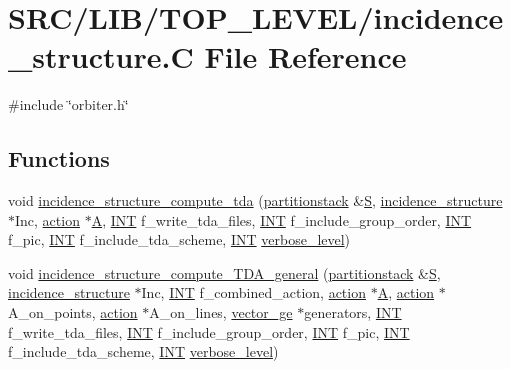\hypertarget{_t_o_p___l_e_v_e_l_2incidence__structure_8_c}{}\section{S\+R\+C/\+L\+I\+B/\+T\+O\+P\+\_\+\+L\+E\+V\+E\+L/incidence\+\_\+structure.C File Reference}
\label{_t_o_p___l_e_v_e_l_2incidence__structure_8_c}
{\ttfamily \#include \char`\"{}orbiter.\+h\char`\"{}}\newline
\subsection*{Functions}
\begin{DoxyCompactItemize}
\item 
void \mbox{\hyperlink{_t_o_p___l_e_v_e_l_2incidence__structure_8_c_ab3a7584f120bbaf752a5bd831d3ebf72}{incidence\+\_\+structure\+\_\+compute\+\_\+tda}} (\mbox{\hyperlink{classpartitionstack}{partitionstack}} \&\mbox{\hyperlink{simeon_8_c_adab47f8243f1b5a2c31df2535d6b37d0}{S}}, \mbox{\hyperlink{classincidence__structure}{incidence\+\_\+structure}} $\ast$Inc, \mbox{\hyperlink{classaction}{action}} $\ast$\mbox{\hyperlink{simeon_8_c_a97833f04c3a9c008df5521a2fc291bb4}{A}}, \mbox{\hyperlink{galois_8h_a09fddde158a3a20bd2dcadb609de11dc}{I\+NT}} f\+\_\+write\+\_\+tda\+\_\+files, \mbox{\hyperlink{galois_8h_a09fddde158a3a20bd2dcadb609de11dc}{I\+NT}} f\+\_\+include\+\_\+group\+\_\+order, \mbox{\hyperlink{galois_8h_a09fddde158a3a20bd2dcadb609de11dc}{I\+NT}} f\+\_\+pic, \mbox{\hyperlink{galois_8h_a09fddde158a3a20bd2dcadb609de11dc}{I\+NT}} f\+\_\+include\+\_\+tda\+\_\+scheme, \mbox{\hyperlink{galois_8h_a09fddde158a3a20bd2dcadb609de11dc}{I\+NT}} \mbox{\hyperlink{simeon_8_c_a818073fbcc2f439e7c56952f67386122}{verbose\+\_\+level}})
\item 
void \mbox{\hyperlink{_t_o_p___l_e_v_e_l_2incidence__structure_8_c_a21ab759f6e646f3fe703c17f39361448}{incidence\+\_\+structure\+\_\+compute\+\_\+\+T\+D\+A\+\_\+general}} (\mbox{\hyperlink{classpartitionstack}{partitionstack}} \&\mbox{\hyperlink{simeon_8_c_adab47f8243f1b5a2c31df2535d6b37d0}{S}}, \mbox{\hyperlink{classincidence__structure}{incidence\+\_\+structure}} $\ast$Inc, \mbox{\hyperlink{galois_8h_a09fddde158a3a20bd2dcadb609de11dc}{I\+NT}} f\+\_\+combined\+\_\+action, \mbox{\hyperlink{classaction}{action}} $\ast$\mbox{\hyperlink{simeon_8_c_a97833f04c3a9c008df5521a2fc291bb4}{A}}, \mbox{\hyperlink{classaction}{action}} $\ast$A\+\_\+on\+\_\+points, \mbox{\hyperlink{classaction}{action}} $\ast$A\+\_\+on\+\_\+lines, \mbox{\hyperlink{classvector__ge}{vector\+\_\+ge}} $\ast$generators, \mbox{\hyperlink{galois_8h_a09fddde158a3a20bd2dcadb609de11dc}{I\+NT}} f\+\_\+write\+\_\+tda\+\_\+files, \mbox{\hyperlink{galois_8h_a09fddde158a3a20bd2dcadb609de11dc}{I\+NT}} f\+\_\+include\+\_\+group\+\_\+order, \mbox{\hyperlink{galois_8h_a09fddde158a3a20bd2dcadb609de11dc}{I\+NT}} f\+\_\+pic, \mbox{\hyperlink{galois_8h_a09fddde158a3a20bd2dcadb609de11dc}{I\+NT}} f\+\_\+include\+\_\+tda\+\_\+scheme, \mbox{\hyperlink{galois_8h_a09fddde158a3a20bd2dcadb609de11dc}{I\+NT}} \mbox{\hyperlink{simeon_8_c_a818073fbcc2f439e7c56952f67386122}{verbose\+\_\+level}})

\end{DoxyCompactItemize}
